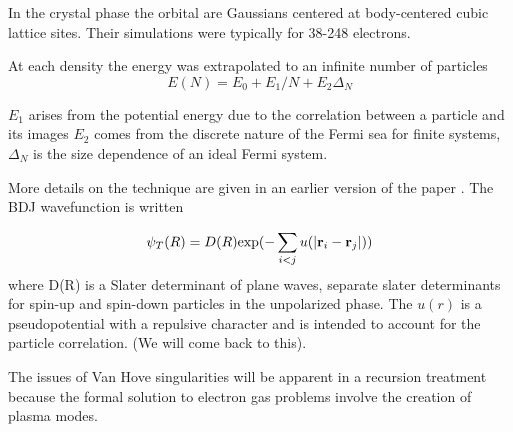 \documentclass{article}
\def\r{{\bf r}}
\begin{document}
In the crystal phase the orbital are Gaussians centered 
at body-centered cubic lattice sites. Their simulations were typically 
for 38-248 electrons.

At each density the energy was extrapolated to an infinite number of particles
%
\begin{equation}
E(N) = E_{0} + E_{1}/N + E_{2}\Delta_{N}
\end{equation}

$E_{1}$ arises from the potential energy due to the correlation between a particle and its images
$E_{2}$ comes from the discrete nature of the Fermi sea for finite systems, $\Delta_{N}$ is the 
size dependence of an ideal Fermi system.

More details on the technique are given in an earlier version of the paper
\cite{ceperley78}. The BDJ wavefunction is written

\begin{equation}
\psi_{T}(R) = D(R) {\rm exp}(-\sum_{i<j} u(|\r_{i}-\r_{j}|))
\end{equation}
%
where D(R) is a Slater determinant of plane waves, separate slater determinants for
spin-up and spin-down particles in the unpolarized phase. The $u(r)$ is a pseudopotential
with a repulsive character and is intended to account for the particle correlation. 
(We will come back to this).

The issues of Van Hove singularities will be apparent in a recursion treatment because 
the formal solution to electron gas problems involve the creation of plasma modes.
\end{document}
